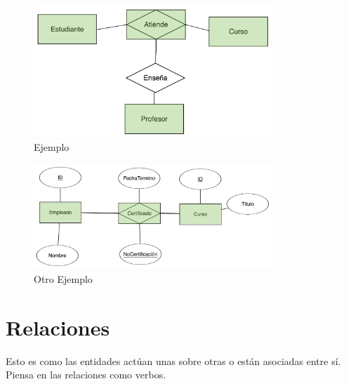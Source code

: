 \documentclass[12pt, fleqn]{report}                             %
\theoremstyle{break}                                            %
\begin{document}
\begin{itemize}
                    \begin{figure}[h]
                        \centering
                        \includegraphics[width=0.80\textwidth]{EjemploEntidadAsociativa}
                        \caption{Ejemplo}
                    \end{figure}

                    \vspace{5em}

                    \begin{figure}[h]
                        \centering
                        \includegraphics[width=0.80\textwidth]{EjemploEntidadAsociativa2}
                        \caption{Otro Ejemplo}
                    \end{figure}
            \end{itemize}



        \clearpage
        \section{Relaciones}
                
            Esto es como las entidades actúan unas sobre otras o están asociadas entre sí.
            Piensa en las relaciones como verbos.
\end{document}
